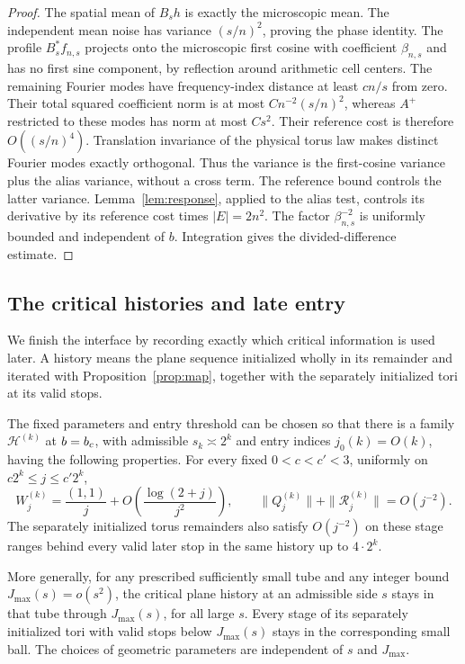\begin{proof}
The spatial mean of $B_sh$ is exactly the microscopic mean.  The
independent mean noise has variance $(s/n)^2$, proving the phase
identity.  The profile $B_s^*f_{n,s}$ projects onto the microscopic
first cosine with coefficient $\beta_{n,s}$ and has no first sine
component, by reflection around arithmetic cell centers.  The remaining
Fourier modes have frequency-index distance at least $cn/s$ from zero.
Their total squared coefficient norm is at most
$Cn^{-2}(s/n)^2$, whereas $A^+$ restricted to these modes has norm at
most $Cs^2$.  Their reference cost is therefore $O((s/n)^4)$.
Translation invariance of the physical torus law makes distinct Fourier
modes exactly orthogonal.  Thus the variance is the first-cosine
variance plus the alias variance, without a cross term.  The reference
bound controls the latter variance.  Lemma~\ref{lem:response}, applied
to the alias test, controls its derivative by its reference cost times
$|E|=2n^2$.  The factor $\beta_{n,s}^{-2}$ is uniformly bounded and
independent of $b$.  Integration gives the divided-difference estimate.
\end{proof}

\subsection{The critical histories and late entry}

We finish the interface by recording exactly which critical information
is used later.  A history means the plane sequence initialized wholly
in its remainder and iterated with Proposition~\ref{prop:map}, together
with the separately initialized tori at its valid stops.

\begin{proposition}\label{prop:critical}
The fixed parameters and entry threshold can be chosen so that there
is a family $\mathcal H^{(k)}$ at $b=b_c$, with admissible
$s_k\asymp2^k$ and entry indices $j_0(k)=O(k)$, having the following
properties.  For every fixed $0<c<c'<3$, uniformly on
$c2^k\le j\le c'2^k$,
\begin{equation}\label{eq:critical-asymptotic}
 W_j^{(k)}=\frac{(1,1)}j+O\!\left(\frac{\log(2+j)}{j^2}\right),
 \qquad
 \|Q_j^{(k)}\|+\|\mathcal R_j^{(k)}\|=O(j^{-2}).
\end{equation}
The separately initialized torus remainders also satisfy $O(j^{-2})$
on these stage ranges behind every valid later stop in the same
history up to $4\cdot2^k$.

More generally, for any prescribed sufficiently small tube and any
integer bound $J_{\max}(s)=o(s^2)$, the critical plane history at an
admissible side $s$ stays in that tube through $J_{\max}(s)$, for all
large $s$.  Every stage of its separately initialized tori with valid
stops below $J_{\max}(s)$ stays in the corresponding small ball.  The
choices of geometric parameters are independent of $s$ and
$J_{\max}$.
\end{proposition}


